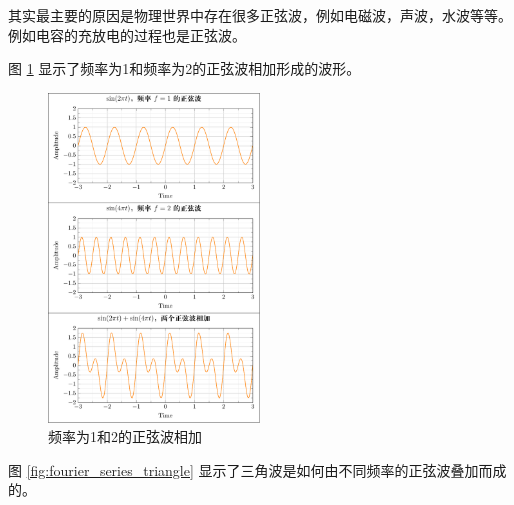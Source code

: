 \documentclass[lang=cn,newtx,10pt,scheme=chinese]{elegantbook}
\begin{document}
其实最主要的原因是物理世界中存在很多正弦波，例如电磁波，声波，水波等等。例如电容的充放电的过程也是正弦波。

图 \ref{fig:summing_sinusoids} 显示了频率为1和频率为2的正弦波相加形成的波形。

\begin{figure}[!htb]
\centering
\includegraphics[width=0.5\textwidth]{figures/summing_sinusoids/summing_sinusoids.pdf}
\caption{频率为1和2的正弦波相加}
\label{fig:summing_sinusoids}
\end{figure}

图 \ref{fig:fourier_series_triangle} 显示了三角波是如何由不同频率的正弦波叠加而成的。
\end{document}
